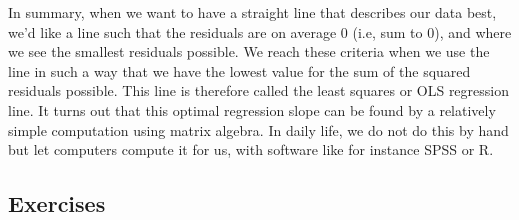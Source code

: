 \documentclass[]{report}\usepackage[]{graphicx}\usepackage[]{color}
\begin{document}
In summary, when we want to have a straight line that describes our data best, we'd like a line such that the residuals are on average 0 (i.e, sum to 0), and where we see the smallest residuals possible. We reach these criteria when we use the line in such a way that we have the lowest value for the sum of the squared residuals possible. This line is therefore called the least squares or OLS regression line. It turns out that this optimal regression slope can be found by a relatively simple computation using matrix algebra. In daily life, we do not do this by hand but let computers compute it for us, with software like for instance SPSS or R.


\subsection{Exercises}
\end{document}
